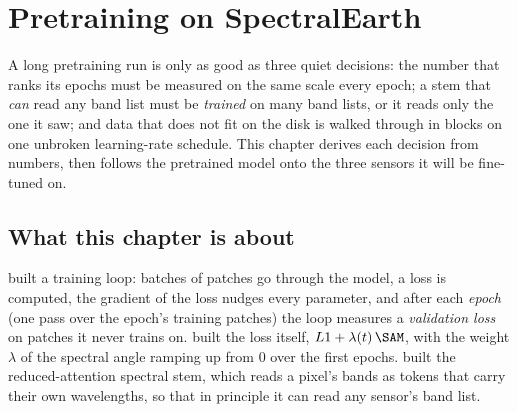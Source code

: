 \chapter{Pretraining on SpectralEarth}\label{ch:pretrain}
\begingroup\setlength{\emergencystretch}{5em}%
\def\tbrk{\hfil\penalty50\hfilneg}%

\begin{onething}
A long pretraining run is only as good as three quiet decisions: the number that ranks its epochs must be
measured on the same scale every epoch; a stem that \emph{can} read any band list must be \emph{trained} on many
band lists, or it reads only the one it saw; and data that does not fit on the disk is walked through in blocks
on one unbroken learning-rate schedule. This chapter derives each decision from numbers, then follows the
pretrained model onto the three sensors it will be fine-tuned on.
\end{onething}

\section{What this chapter is about}\label{sec:pretrain:intro}

 built a training loop: batches of patches go through the model, a loss is computed, the
gradient of the loss nudges every parameter, and after each \emph{epoch} (one pass over the epoch's training
patches) the loop measures a \emph{validation loss} on patches it never trains on.  built the loss
itself, $L1 + \lambda(t)\,\SAM$, with the weight $\lambda$ of the spectral angle \citep{kruse1993spectral} ramping up from 0 over the first
epochs.  built the reduced-attention spectral stem, which reads a pixel's bands as tokens
that carry their own wavelengths, so that in principle it can read any sensor's band list.

